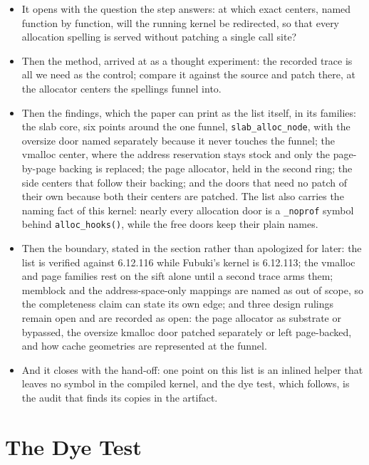 \documentclass[11pt]{article}
\begin{document}
\begin{itemize}
\item It opens with the question the step answers: at which exact centers, named function by function, will the running kernel be redirected, so that every allocation spelling is served without patching a single call site?
\item Then the method, arrived at as a thought experiment: the recorded trace is all we need as the control; compare it against the source and patch there, at the allocator centers the spellings funnel into.
\item Then the findings, which the paper can print as the list itself, in its families: the slab core, six points around the one funnel, \texttt{slab\_alloc\_node}, with the oversize door named separately because it never touches the funnel; the vmalloc center, where the address reservation stays stock and only the page-by-page backing is replaced; the page allocator, held in the second ring; the side centers that follow their backing; and the doors that need no patch of their own because both their centers are patched. The list also carries the naming fact of this kernel: nearly every allocation door is a \texttt{\_noprof} symbol behind \texttt{alloc\_hooks()}, while the free doors keep their plain names.
\item Then the boundary, stated in the section rather than apologized for later: the list is verified against 6.12.116 while Fubuki's kernel is 6.12.113; the vmalloc and page families rest on the sift alone until a second trace arms them; memblock and the address-space-only mappings are named as out of scope, so the completeness claim can state its own edge; and three design rulings remain open and are recorded as open: the page allocator as substrate or bypassed, the oversize kmalloc door patched separately or left page-backed, and how cache geometries are represented at the funnel.
\item And it closes with the hand-off: one point on this list is an inlined helper that leaves no symbol in the compiled kernel, and the dye test, which follows, is the audit that finds its copies in the artifact.
\end{itemize}

\section{The Dye Test}
\end{document}
